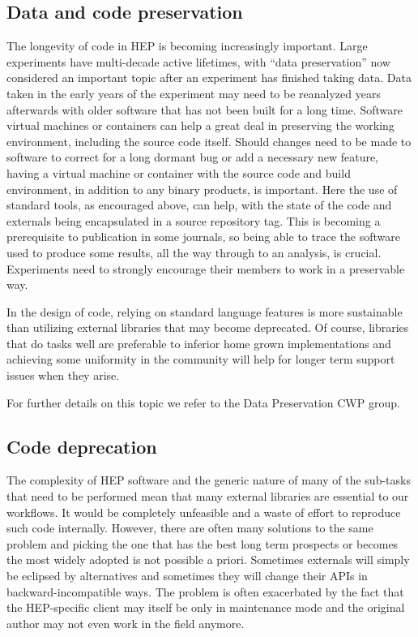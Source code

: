 \documentclass[12pt,a4paper]{article}
\begin{document}
\hypertarget{data-and-code-preservation}{%
\subsection{Data and code
preservation}\label{data-and-code-preservation}}

The longevity of code in HEP is becoming increasingly important. Large
experiments have multi-decade active lifetimes, with ``data
preservation'' now considered an important topic after an experiment has
finished taking data. Data taken in the early years of the experiment
may need to be reanalyzed years afterwards with older software that has
not been built for a long time. Software virtual machines or containers
can help a great deal in preserving the working environment, including
the source code itself. Should changes need to be made to software to
correct for a long dormant bug or add a necessary new feature, having a
virtual machine or container with the source code and build environment,
in addition to any binary products, is important. Here the use of
standard tools, as encouraged above, can help, with the state of the
code and externals being encapsulated in a source repository tag. This
is becoming a prerequisite to publication in some journals, so being
able to trace the software used to produce some results, all the way
through to an analysis, is crucial. Experiments need to strongly
encourage their members to work in a preservable way.

In the design of code, relying on standard language features is more
sustainable than utilizing external libraries that may become
deprecated. Of course, libraries that do tasks well are preferable to
inferior home grown implementations and achieving some uniformity in the
community will help for longer term support issues when they arise.

For further details on this topic we refer to the Data Preservation CWP
group.

\hypertarget{code-deprecation}{%
\subsection{Code deprecation}\label{code-deprecation}}

The complexity of HEP software and the generic nature of many of the
sub-tasks that need to be performed mean that many external libraries
are essential to our workflows. It would be completely unfeasible and a
waste of effort to reproduce such code internally. However, there are
often many solutions to the same problem and picking the one that has
the best long term prospects or becomes the most widely adopted is not
possible a priori. Sometimes externals will simply be eclipsed by
alternatives and sometimes they will change their APIs in
backward-incompatible ways. The problem is often exacerbated by the fact
that the HEP-specific client may itself be only in maintenance mode and
the original author may not even work in the field anymore.~
\end{document}
